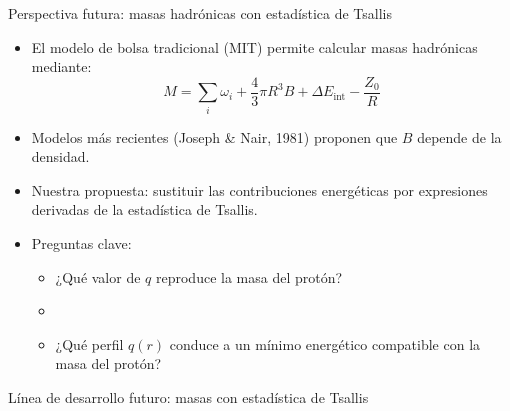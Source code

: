 \documentclass{beamer}
\begin{document}
\begin{frame}{Perspectiva futura: masas hadrónicas con estadística de Tsallis}
  \begin{itemize}
    \item El modelo de bolsa tradicional (MIT) permite calcular masas hadrónicas mediante:
    \[
      M = \sum_i \omega_i + \frac{4}{3} \pi R^3 B + \Delta E_{\text{int}} - \frac{Z_0}{R}
    \]
    \item Modelos más recientes (Joseph \& Nair, 1981) proponen que \( B \) depende de la densidad.
    \item Nuestra propuesta: sustituir las contribuciones energéticas por expresiones derivadas de la estadística de Tsallis.
    \item Preguntas clave:
    \begin{itemize}
      \item ¿Qué valor de \( q \) reproduce la masa del protón?
      \item \item ¿Qué perfil \( q(r) \) conduce a un mínimo energético compatible con la masa del protón?
    \end{itemize}
  \end{itemize}
\end{frame}

\begin{frame}{Línea de desarrollo futuro: masas con estadística de Tsallis}
  \centering
\end{frame}
\end{document}
